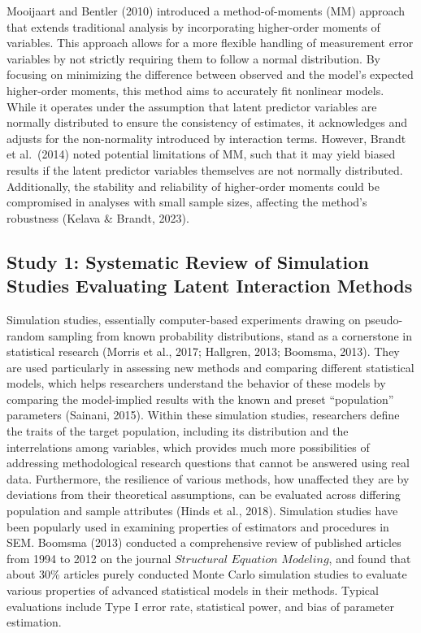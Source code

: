 \documentclass[
  man]{apa7}
\begin{document}
Mooijaart and Bentler (2010) introduced a method-of-moments (MM) approach that extends traditional analysis by incorporating higher-order moments of variables. This approach allows for a more flexible handling of measurement error variables by not strictly requiring them to follow a normal distribution. By focusing on minimizing the difference between observed and the model's expected higher-order moments, this method aims to accurately fit nonlinear models. While it operates under the assumption that latent predictor variables are normally distributed to ensure the consistency of estimates, it acknowledges and adjusts for the non-normality introduced by interaction terms. However, Brandt et al.~(2014) noted potential limitations of MM, such that it may yield biased results if the latent predictor variables themselves are not normally distributed. Additionally, the stability and reliability of higher-order moments could be compromised in analyses with small sample sizes, affecting the method's robustness (Kelava \& Brandt, 2023).

\hypertarget{study-1-systematic-review-of-simulation-studies-evaluating-latent-interaction-methods}{%
\subsection{Study 1: Systematic Review of Simulation Studies Evaluating Latent Interaction Methods}\label{study-1-systematic-review-of-simulation-studies-evaluating-latent-interaction-methods}}

Simulation studies, essentially computer-based experiments drawing on pseudo-random sampling from known probability distributions, stand as a cornerstone in statistical research (Morris et al., 2017; Hallgren, 2013; Boomsma, 2013). They are used particularly in assessing new methods and comparing different statistical models, which helps researchers understand the behavior of these models by comparing the model-implied results with the known and preset ``population'' parameters (Sainani, 2015). Within these simulation studies, researchers define the traits of the target population, including its distribution and the interrelations among variables, which provides much more possibilities of addressing methodological research questions that cannot be answered using real data. Furthermore, the resilience of various methods, how unaffected they are by deviations from their theoretical assumptions, can be evaluated across differing population and sample attributes (Hinds et al., 2018). Simulation studies have been popularly used in examining properties of estimators and procedures in SEM. Boomsma (2013) conducted a comprehensive review of published articles from 1994 to 2012 on the journal \(\textit{Structural Equation Modeling}\), and found that about 30\% articles purely conducted Monte Carlo simulation studies to evaluate various properties of advanced statistical models in their methods. Typical evaluations include Type I error rate, statistical power, and bias of parameter estimation.
\end{document}
